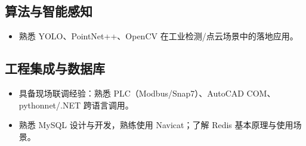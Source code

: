\documentclass[UTF8]{ctexart}
\begin{document}
\subsection*{算法与智能感知}
\begin{itemize}
    \item 熟悉 YOLO、PointNet++、OpenCV 在工业检测/点云场景中的落地应用。
\end{itemize}

\subsection*{工程集成与数据库}
\begin{itemize}
    \item 具备现场联调经验：熟悉 PLC（Modbus/Snap7）、AutoCAD COM、pythonnet/.NET 跨语言调用。
    \item 熟悉 MySQL 设计与开发，熟练使用 Navicat；了解 Redis 基本原理与使用场景。
\end{itemize}
\end{document}
